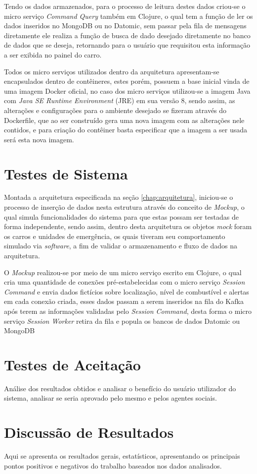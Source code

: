 Tendo os dados armazenados, para o processo de leitura destes dados criou-se o micro serviço \textit{Command Query} também em Clojure, o qual tem a função de ler os dados inseridos no MongoDB ou no Datomic, sem passar pela fila de mensagens diretamente ele realiza a função de busca de dado desejado diretamente no banco de dados que se deseja, retornando para o usuário que requisitou esta informação a ser exibida no painel do carro.

Todos os micro serviços  utilizados dentro da arquitetura apresentam-se encapsulados dentro de contêineres, estes porém, possuem a base inicial vinda de uma imagem Docker oficial, no caso dos micro serviços utilizou-se a imagem Java com \textit{Java SE Runtime Environment} (JRE) em sua versão 8, sendo assim, as alterações e configurações para o ambiente desejado se fizeram através do Dockerfile, que ao ser construído gera uma nova imagem com as alterações nele contidos, e para criação do contêiner basta especificar que a imagem a ser usada será esta nova imagem.



\section{Testes de Sistema}
\label{sec:testessistema}
Montada a arquitetura especificada na seção \ref{chap:arquitetura}, iniciou-se o processo de inserção de dados nesta estrutura através do conceito de \textit{Mockup}, o qual simula funcionalidades do sistema para que estas possam ser testadas de forma independente, sendo assim, dentro desta arquitetura os objetos \textit{mock} foram os carros e unidades de emergência, os quais tiveram seu comportamento simulado via \textit{software}, a fim de validar o armazenamento e fluxo de dados na arquitetura.

O \textit{Mockup} realizou-se por meio de um micro serviço escrito em Clojure, o qual cria uma quantidade de conexões pré-estabelecidas com o micro serviço \textit{Session Command} e envia dados fictícios sobre localização, nível de combustível e alertas em cada conexão criada, esses dados passam a serem inseridos na fila do Kafka após terem as informações validadas pelo \textit{Session Command}, desta forma o micro serviço \textit{Session Worker} retira da fila e popula os bancos de dados Datomic ou MongoDB

\section{Testes de Aceitação}
\label{sec:testesaceitacao}
Análise dos resultados obtidos e analisar o benefício do usuário utilizador do sistema, analisar se seria aprovado pelo mesmo e pelos agentes sociais.

\section{Discussão de Resultados}
\label{sec:discussãoresultados}
Aqui se apresenta os resultados gerais, estatísticos, apresentando os principais pontos positivos e negativos do trabalho baseados nos dados analisados.